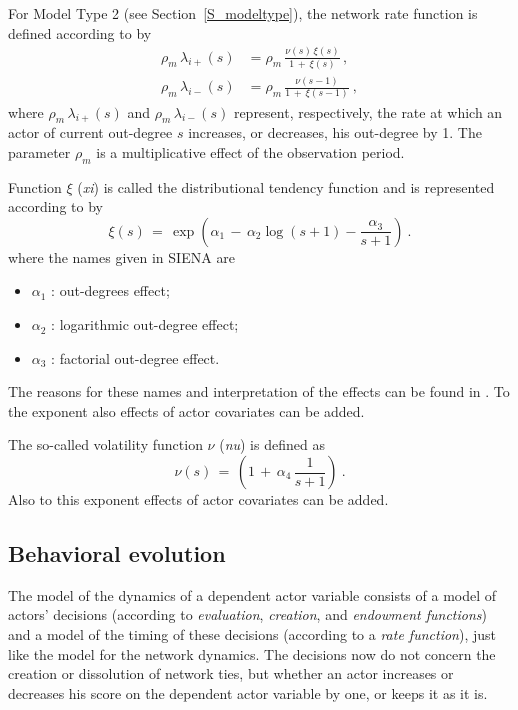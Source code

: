 \documentclass[a4paper,fleqn,11pt]{article}
\newcommand{\+}{\, + \,}
\newcommand{\SI}{{\sf SIENA }}
\begin{document}
For Model Type 2 (see Section~\ref{S_modeltype}), the network rate
function is defined according to \citet{Snijders03} by
\begin{align*}
  \rho_m\, \lambda_{i+}(s) & =
               \rho_m\,\frac{\nu(s)\, \xi(s)}{1 \,+\, \xi(s)}\, , \\
  \rho_m\, \lambda_{i-}(s) & =   \rho_m\, \frac{\nu(s-1)}{1 \,+\, \xi(s-1)} \ ,
\end{align*}
where $ \rho_m\,\lambda_{i+}(s)$ and $ \rho_m\,\lambda_{i-}(s)$
represent, respectively, the rate at which an actor of current
out-degree $s$ increases, or decreases, his out-degree by 1. The
parameter $\rho_m$ is a multiplicative effect of the observation
period.

Function $\xi$ (\emph{xi}) is called the distributional tendency
function and is represented according to \citet[formula (17)]{Snijders03} by
\[ \xi(s) \,=\, \exp\left(\alpha_1 \,-\, \alpha_2 \log(s+1) - \frac{\alpha_3}{s+1}\right)  \ . \]
where the names given in \SI are
\begin{itemize}
 \item $\alpha_1$ : out-degrees effect;
 \item $\alpha_2$ : logarithmic out-degree effect;
 \item $\alpha_3$ : factorial out-degree effect.
\end{itemize}
The reasons for these names and interpretation of the effects
can be found in \citet{Snijders03}.
To the exponent also effects of actor covariates can be added.

The so-called volatility function $\nu$ (\emph{nu}) is defined as
\[ \nu(s) \,=\, \left( 1 \,+\, \alpha_4 \, \frac{1}{s+1} \right) \ . \]
Also to this exponent effects of actor covariates can be added.
\fi

\subsection{Behavioral evolution}
\label{S_ff_b}

The model of the dynamics of a dependent actor variable
consists of a model of actors' decisions (according to {\it
evaluation}, {\it creation}, and {\it endowment functions})
and a model of the timing
of these decisions (according to a {\it rate function}),
just like the model for the network dynamics. The
decisions now do not concern the creation or dissolution of
network ties, but whether an actor increases or decreases his
score on the dependent actor variable by one, or keeps it as it
is.
\end{document}
